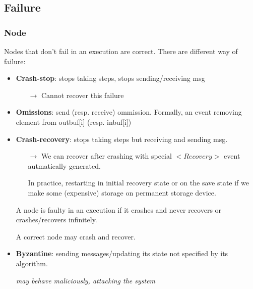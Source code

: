 \subsection{Failure}

\subsubsection{Node}

Nodes that don’t fail in an execution are
correct. There are different way of failure:

\begin{itemize}
    \item \textbf{Crash-stop}: stops taking steps, stops sending/receiving msg

        \begin{itemize}
            \item[$\to$] Cannot recover this failure
        \end{itemize}

    \item \textbf{Omissions}: send (resp. receive) ommission. Formally, an
        event removing element from outbuf[i] (resp. inbuf[i])

    \item \textbf{Crash-recovery}: stops taking steps but receiving and
        sending msg.

        \begin{itemize}
            \item[$\to$] We can recover after crashing with special $<Recovery>$ event
                autmatically generated.

                In practice, restarting in initial recovery state or on
                the save state if we make some (expensive) storage on
                permanent storage device.
        \end{itemize}

        A node is faulty in an execution if it crashes and never
        recovers or crashes/recovers infinitely.

        A correct node may crash and recover.

    \item \textbf{Byzantine}: sending messages/updating its state
        not specified by its algorithm.

        \textit{may behave maliciously, attacking the system}

\end{itemize}

